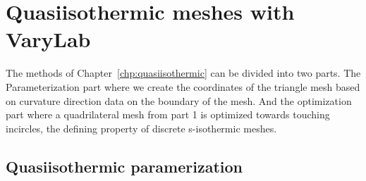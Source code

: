 \documentclass[Thesis.tex]{subfiles}
\begin{document}
\section{Quasiisothermic meshes with {\sc VaryLab}}
\label{sec:quasiisothermic_varylab}

The methods of Chapter~\ref{chp:quasiisothermic} can be divided into two parts. The Parameterization part where we create the coordinates of the triangle mesh based on curvature direction data on the boundary of the mesh. And the optimization part where a quadrilateral mesh from part 1 is optimized towards touching incircles, the defining property of discrete s-isothermic meshes.

\subsection{Quasiisothermic paramerization}
\end{document}
